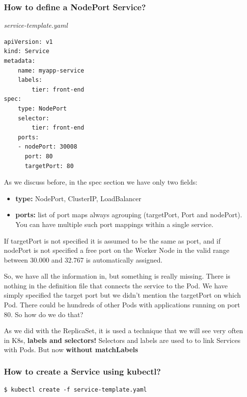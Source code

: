 \documentclass{article}
\newenvironment{blocktemplateII}[1]{%
    \tcolorbox[beamer,%
    noparskip,breakable,
    colframe=Green,%
    colbacklower=LimeGreen!75!LightGreen,%
    title=#1]}%
    {\endtcolorbox}
\newenvironment{codetemplate}[1][]{%
  \mybasecolorbox[#1]
  \itshape
}{%
  \endmybasecolorbox
}
\begin{document}
\subsubsection{How to define a NodePort Service?}

\begin{codetemplate}{service-template.yaml}
\begin{verbatim}
apiVersion: v1
kind: Service
metadata:
    name: myapp-service
    labels:
        tier: front-end
spec:
    type: NodePort
    selector:
        tier: front-end
    ports:
    - nodePort: 30008
      port: 80
      targetPort: 80
\end{verbatim}
\end{codetemplate}

As we discuss before, in the spec section we have only two fields:

\begin{itemize}
    \item\textbf{type:} NodePort, ClusterIP, LoadBalancer
    \item \textbf{ports:} list of port maps always agrouping (targetPort, Port and nodePort). You can have multiple such port mappings within a single service.
\end{itemize}

\begin{blocktemplateII}{NOTE}
If targetPort is not specified it is assumed to be the same as port, and if nodePort is not specified a free port on the Worker Node in the valid range between 30.000 and 32.767 is automatically assigned.
\end{blocktemplateII}

So, we have all the information in, but something is really missing. There is nothing in the definition file that connects the service to the Pod. We have simply specified the target port but we didn't mention the targetPort on which Pod. There could be hundreds of other Pods with applications running on port 80. So how do we do that?

As we did with the ReplicaSet, it is used a technique that we will see very often in K8s, \textbf{labels and selectors!} Selectors and labels are used to to link Services with Pods. But now \textbf{without matchLabels}

\subsubsection{How to create a Service using kubectl?}
\begin{codetemplate}{}
\begin{verbatim}
$ kubectl create -f service-template.yaml
\end{verbatim}
\end{codetemplate}
\end{document}
